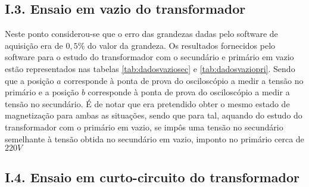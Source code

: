 \documentclass[%
  reprint,
  nofootinbib,
  amsmath,amssymb,
  aps,
  10pt,
]{revtex4-1}
\begin{document}
\subsection*{I.3. Ensaio em vazio do transformador}
Neste ponto considerou-se que o erro das grandezas dadas pelo software de aquisição era de $0,5\%$ do valor da grandeza. Os resultados fornecidos pelo software para o estudo do transformador com o secundário e primário em vazio estão representados nas tabelas \ref{tab:dadosvaziosec} e \ref{tab:dadosvaziopri}.
Sendo que a posição $a$ corresponde à ponta de prova do osciloscópio a medir a tensão no primário e a posição $b$ corresponde à ponta de prova do osciloscópio a medir a tensão no secundário.
É de notar que era pretendido obter o mesmo estado de magnetização para ambas as situações, sendo que para tal, aquando do estudo do transformador com o primário em vazio, se impôs uma tensão no secundário semelhante à tensão obtida no secundário em vazio, imponto no primário cerca de $220V$
\subsection*{I.4. Ensaio em curto-circuito do transformador}
\end{document}
